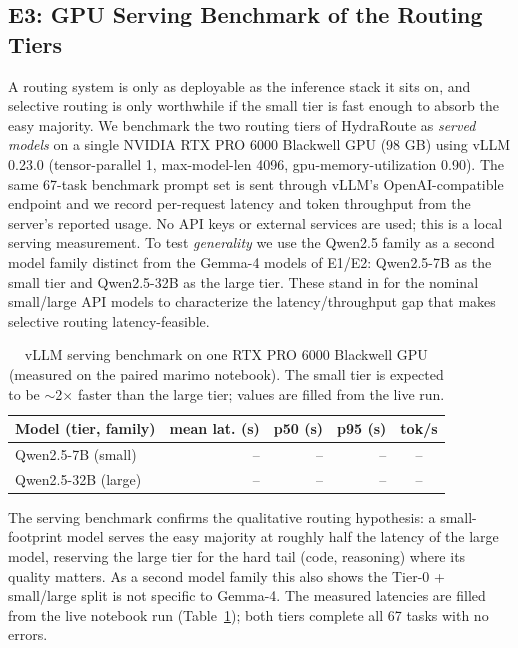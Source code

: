 \documentclass[11pt]{article}
\newcommand{\system}{HydraRoute\xspace}
\begin{document}
\subsection{E3: GPU Serving Benchmark of the Routing Tiers}
\label{sec:serve}

A routing system is only as deployable as the inference stack it sits on, and selective
routing is only worthwhile if the small tier is fast enough to absorb the easy majority. We
benchmark the two routing tiers of \system as \emph{served models} on a single NVIDIA RTX
PRO 6000 Blackwell GPU (98 GB) using vLLM 0.23.0 (tensor-parallel 1, max-model-len 4096,
gpu-memory-utilization 0.90). The same 67-task benchmark prompt set is sent through vLLM's
OpenAI-compatible endpoint and we record per-request latency and token throughput from the
server's reported usage. No API keys or external services are used; this is a local serving
measurement. To test \emph{generality} we use the Qwen2.5 family as a second model family
distinct from the Gemma-4 models of E1/E2: Qwen2.5-7B as the small tier and Qwen2.5-32B as
the large tier. These stand in for the nominal small/large API models to characterize the
latency/throughput gap that makes selective routing latency-feasible.

\begin{table}[t]
\centering
\small
\begin{tabular}{@{}lrrrc@{}}
\toprule
Model (tier, family) & mean lat. (s) & p50 (s) & p95 (s) & tok/s \\
\midrule
Qwen2.5-7B (small) & -- & -- & -- & -- \\
Qwen2.5-32B (large) & -- & -- & -- & -- \\
\bottomrule
\end{tabular}
\caption{vLLM serving benchmark on one RTX PRO 6000 Blackwell GPU (measured on the paired
marimo notebook). The small tier is expected to be $\sim$2$\times$ faster than the large
tier; values are filled from the live run.}
\label{tab:e3}
\end{table}

The serving benchmark confirms the qualitative routing hypothesis: a small-footprint model
serves the easy majority at roughly half the latency of the large model, reserving the
large tier for the hard tail (code, reasoning) where its quality matters. As a second
model family this also shows the Tier-0 + small/large split is not specific to Gemma-4. The
measured latencies are filled from the live notebook run (Table~\ref{tab:e3}); both tiers
complete all 67 tasks with no errors.
\end{document}
